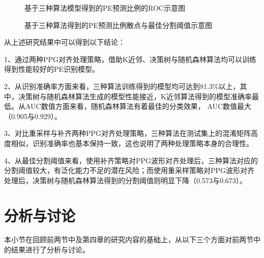 \begin{figure}[htbp]
    \centering
    \quad
    \caption{\label{fig:model_roc2}基于三种算法模型得到的PE预测比例的ROC示意图}
\end{figure}

\begin{figure}[htbp]
    \centering
    \quad
    \quad
    \quad
    \caption{\label{fig:pr_model2}基于三种算法得到的PE预测比例散点与最佳分割阈值示意图}
\end{figure}

从上述研究结果中可以得到以下结论：

1、通过两种PPG对齐处理策略，借助K近邻、决策树与随机森林算法均可以训练得到性能较好的PE识别模型。

2、从识别准确率方面来看，三种算法训练得到的模型均可达到81.3\%以上，其中，决策树与随机森林算法生成的模型性能接近，K近邻算法得到的模型准确率最低。从AUC数值方面来看，随机森林算法有着最佳的分类效果，
AUC数值最大（0.905与0.929）。

3、对比重采样与补齐两种PPG对齐处理策略，三种算法在测试集上的混淆矩阵高度相似，识别准确率也基本保持一致，这也说明了两种处理策略本身的合理性。

4、从最佳分割阈值来看，使用补齐策略对PPG波形对齐处理后，三种算法对应的分割阈值较大，有泛化能力不足的潜在风险；而使用重采样策略对PPG波形对齐处理后，决策树与随机森林算法得到的分割阈值则明显下降（0.573与0.673）。

\section{分析与讨论}
本小节在回顾前两节中及第四章的研究内容的基础上，从以下三个方面对前两节中的结果进行了分析与讨论。

